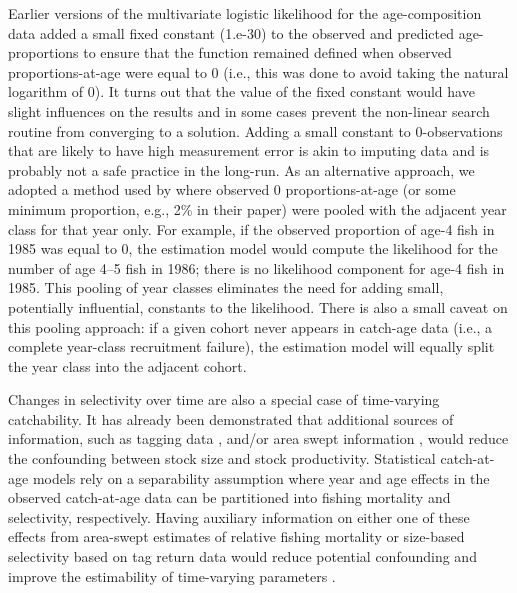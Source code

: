 Earlier versions of the multivariate logistic likelihood for the age-composition data added a small fixed constant (1.e-30) to the observed and predicted age-proportions to ensure that the function remained defined when observed proportions-at-age were equal to 0 (i.e., this was done to avoid taking the natural logarithm of 0).  It turns out that the value of the fixed constant would have slight influences on the results and in some cases prevent the non-linear search routine from converging to a solution.  Adding a small constant to 0-observations that are likely to have high measurement error is akin to imputing data and is probably not a safe practice in the long-run.  As an alternative approach, we adopted a method used by \cite{richards1997visualizing} where observed 0 proportions-at-age (or some minimum proportion, e.g., 2\% in their paper) were pooled with the adjacent year class for that year only.  For example, if the observed proportion of age-4 fish in 1985 was equal to 0, the estimation model would compute the likelihood for the number of age 4--5 fish in 1986;  there is no likelihood component for age-4 fish in 1985.  This pooling of year classes eliminates the need for adding small, potentially influential, constants to the likelihood. There is also a small caveat on this pooling approach: if a given cohort never appears in catch-age data (i.e., a complete year-class recruitment failure), the estimation model will equally split the year class into the adjacent cohort.  

Changes in selectivity over time are also a special case of time-varying catchability.  It has already been demonstrated that additional sources of information, such as tagging data \citep{martell2002implementing}, and/or area swept information \citep{winters1985interaction}, would reduce the confounding between stock size and stock productivity.  Statistical catch-at-age models rely on a separability assumption where year and age effects in the observed catch-at-age data can be partitioned into fishing mortality and selectivity, respectively.  Having auxiliary information on either one of these effects from area-swept estimates of relative fishing mortality or size-based selectivity based on tag return data would reduce potential confounding and improve the estimability of time-varying parameters \citep[e.g.,][]{sinclair2002disentangling}.

